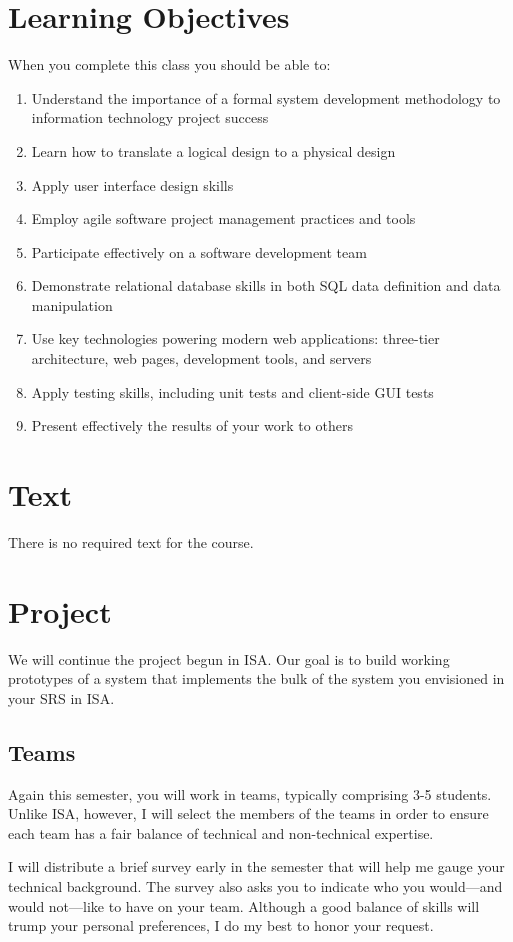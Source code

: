 \documentclass{article}
\begin{document}
\section{Learning Objectives}
\label{sec:orgheadline3}
When you complete this class you should be able to:
\begin{enumerate}
\item Understand the importance of a formal system development methodology to information
technology project success
\item Learn how to translate a logical design to a physical design
\item Apply user interface design skills
\item Employ agile software project management practices and tools
\item Participate effectively on a software development team
\item Demonstrate relational database skills in both SQL data definition and data manipulation
\item Use key technologies powering modern web applications: three-tier architecture, web pages,
development tools, and servers
\item Apply testing skills, including unit tests and client-side GUI tests
\item Present effectively the results of your work to others
\end{enumerate}
\section{Text}
\label{sec:orgheadline4}
There is no required text for the course.
\section{Project}
\label{sec:orgheadline9}
We will continue the project begun in ISA. Our goal is to build working prototypes of a
system that implements the bulk of the system you envisioned in your SRS in ISA.
\subsection{Teams}
\label{sec:orgheadline5}
Again this semester, you will work in teams,
typically comprising 3-5 students.
Unlike ISA, however, I will select the members of the teams
in order to ensure each team has a fair balance
of technical and non-technical expertise.

I will distribute a brief survey early in the semester
that will help me gauge your technical background.
The survey also asks you to indicate who you would---and would not---like
to have on your team.
Although a good balance of skills will trump your personal preferences,
I do my best to honor your request.
\end{document}
